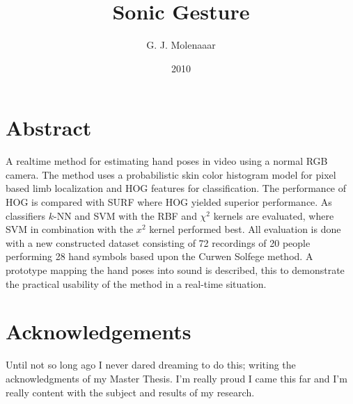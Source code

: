 \documentclass[a4paper, 11pt]{book}
\begin{document}
\thispagestyle{empty}

\title{Sonic Gesture}
\author{G. J. Molenaaar}
\date{2010}
\maketitle{}

\chapter*{Abstract}
A real\-time method for estimating hand poses in video using a normal RGB camera. The method uses a probabilistic skin color histogram model for pixel based limb localization and HOG features for classification. The performance of HOG is compared with SURF where HOG yielded superior performance. As classifiers $k$-NN and SVM with the RBF and $\chi^2$ kernels are evaluated, where SVM in combination with the $x^2$ kernel performed best. All evaluation is done with a new constructed dataset consisting of 72 recordings of 20 people performing 28 hand symbols based upon the Curwen Solfege method. A prototype mapping the hand poses into sound is described, this to demonstrate the practical usability of the method in a real-time situation.

\setcounter{page}{1}

\tableofcontents{}
\listoffigures{}
\listoftables{}

\chapter*{Acknowledgements}
Until not so long ago I never dared dreaming to do this; writing the acknowledgments of my Master Thesis. I'm really proud I came this far and I'm really content with the subject and results of my research.

\cleardoublepage
{}
\setcounter{page}{1}














\cleardoublepage
{}
{}





\end{document}
